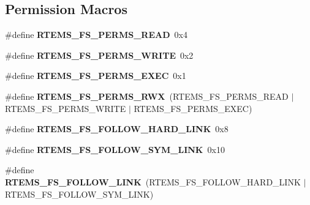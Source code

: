 \subsection*{Permission Macros}
\begin{DoxyCompactItemize}
\item 
\mbox{\label{group__LibIO_ga3f9cf74a578df442557e9187dca57053}} 
\#define {\bfseries R\+T\+E\+M\+S\+\_\+\+F\+S\+\_\+\+P\+E\+R\+M\+S\+\_\+\+R\+E\+AD}~0x4
\item 
\mbox{\label{group__LibIO_ga10be2b4c17a051ff794fe11eae56b141}} 
\#define {\bfseries R\+T\+E\+M\+S\+\_\+\+F\+S\+\_\+\+P\+E\+R\+M\+S\+\_\+\+W\+R\+I\+TE}~0x2
\item 
\mbox{\label{group__LibIO_ga622acb579d77155e730528b94d41bd0b}} 
\#define {\bfseries R\+T\+E\+M\+S\+\_\+\+F\+S\+\_\+\+P\+E\+R\+M\+S\+\_\+\+E\+X\+EC}~0x1
\item 
\mbox{\label{group__LibIO_ga426b596f39d7f94ebddabf280095b053}} 
\#define {\bfseries R\+T\+E\+M\+S\+\_\+\+F\+S\+\_\+\+P\+E\+R\+M\+S\+\_\+\+R\+WX}~(R\+T\+E\+M\+S\+\_\+\+F\+S\+\_\+\+P\+E\+R\+M\+S\+\_\+\+R\+E\+AD $\vert$ R\+T\+E\+M\+S\+\_\+\+F\+S\+\_\+\+P\+E\+R\+M\+S\+\_\+\+W\+R\+I\+TE $\vert$ R\+T\+E\+M\+S\+\_\+\+F\+S\+\_\+\+P\+E\+R\+M\+S\+\_\+\+E\+X\+EC)
\item 
\mbox{\label{group__LibIO_ga24a10a169d7f5237b4f3b22b518f838b}} 
\#define {\bfseries R\+T\+E\+M\+S\+\_\+\+F\+S\+\_\+\+F\+O\+L\+L\+O\+W\+\_\+\+H\+A\+R\+D\+\_\+\+L\+I\+NK}~0x8
\item 
\mbox{\label{group__LibIO_gadac3d8692c68b492d9121089dabf1b9d}} 
\#define {\bfseries R\+T\+E\+M\+S\+\_\+\+F\+S\+\_\+\+F\+O\+L\+L\+O\+W\+\_\+\+S\+Y\+M\+\_\+\+L\+I\+NK}~0x10
\item 
\mbox{\label{group__LibIO_gaa47d6e7be061755dcfe7d48d5a51f23e}} 
\#define {\bfseries R\+T\+E\+M\+S\+\_\+\+F\+S\+\_\+\+F\+O\+L\+L\+O\+W\+\_\+\+L\+I\+NK}~(R\+T\+E\+M\+S\+\_\+\+F\+S\+\_\+\+F\+O\+L\+L\+O\+W\+\_\+\+H\+A\+R\+D\+\_\+\+L\+I\+NK $\vert$ R\+T\+E\+M\+S\+\_\+\+F\+S\+\_\+\+F\+O\+L\+L\+O\+W\+\_\+\+S\+Y\+M\+\_\+\+L\+I\+NK)
\item 
\mbox{\label{group__LibIO_ga3aedb1624c4109e5d12c6de4b74f4024}} 

\end{DoxyCompactItemize}
